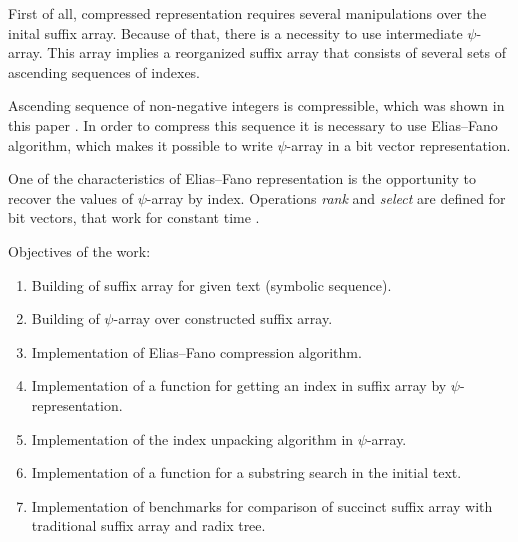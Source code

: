First of all, compressed representation requires several manipulations over the inital suffix array.
Because of that, there is a necessity to use intermediate $\psi$-array.
This array implies a reorganized suffix array that consists of several sets of ascending sequences of indexes.

Ascending sequence of non-negative integers is compressible, which was shown in this paper \cite{pibiri2014dynamic}.
In order to compress this sequence it is necessary to use Elias--Fano algorithm, which makes it possible to
write $\psi$-array in a bit vector representation.

One of the characteristics of Elias--Fano representation is the opportunity to recover the values of $\psi$-array
by index. Operations \emph{rank} and \emph{select} are defined for bit vectors,
that work for constant time \cite{farina2009rank}.

Objectives of the work:

\begin{enumerate}
    \item Building of suffix array for given text (symbolic sequence).
    \item Building of $\psi$-array over constructed suffix array.
    \item Implementation of Elias--Fano compression algorithm.
    \item Implementation of a function for getting an index in suffix array by $\psi$-representation.
    \item Implementation of the index unpacking algorithm in $\psi$-array.
    \item Implementation of a function for a substring search in the initial text.
    \item Implementation of benchmarks for comparison of succinct suffix array with
    traditional suffix array and radix tree.
\end{enumerate}
